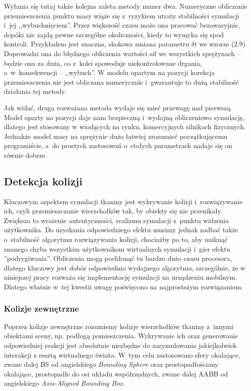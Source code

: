 			Wyłania się tutaj także kolejna zaleta metody numer dwa. Numeryczne obliczanie przemieszczenia punktu masy wiąże się z~ryzykiem utraty stabilności symulacji i~jej ,,wybuchnięciem''. Przez większość czasu może ona pracować bezawaryjnie, dopóki nie zajdą pewne szczególne okoliczności, kiedy to wymyka się spod kontroli. Przykładem jest znaczna, skokowa zmiana parametru \( \delta t \) we wzorze (2.9) Doprowadzi ona do błędnego obliczenia wartości sił we wszystkich sprężynach -- będzie ona za duża, co z~kolei spowoduje niekontrolowane drgania, a~w~konsekwencji -- ,,wybuch''. W modelu opartym na pozycji korekcja przemieszczenia nie jest obliczana numerycznie i~gwarantuje to dużą stabilność działania tej metody.
			
			Jak widać, druga rozważana metoda wydaje się mieć przewagę nad pierwszą. Model oparty na pozycji daje nam bezpieczną i~wydajną obliczeniowo symulację, dlatego jest stosowany w wiodących na rynku, komercyjnych silnikach fizycznych. Jednakże model masy na sprężynie dużo łatwiej zrozumieć początkującemu programiście, a~do prostych zastosowań o~stałych parametrach nadaje się on równie dobrze.
		
		\subsection{Detekcja kolizji}
		\label{t:teoria:analiza:kolizje}
		
			Kluczowym aspektem symulacji tkaniny jest wykrywanie kolizji i~rozwiązywanie ich, czyli przemieszczanie wierzchołków tak, by obiekty się nie przenikały. Zwiększa to wrażenie autentyczności, realizmu symulacji z~punktu widzenia użytkownika. Do uzyskania odpowiedniego efektu musimy jednak zadbać także o~stabilność algorytmu rozwiązywania kolizji, chociażby po to, aby uniknąć znanego chyba wszystkim użytkownikom wirtualnych symulacji i~gier efektu ''podrygiwania''. Obliczenia mogą pochłonąć tu bardzo dużo czasu procesora, dlatego kluczowy jest dobór odpowiednio wydajnego algorytmu, szczególnie, że w niniejszej pracy rozważa się implementację symulacji na urządzeniu mobilnym. Dlatego właśnie w~tej kwestii uwagę poświęcono na najprostszym rozwiązaniom.
		
			\subsubsection{Kolizje zewnętrzne}
			\label{t:teoria:analiza:kolizje:zewn}
			
				Poprzez kolizje zewnętrzne rozumiemy kolizje wierzchołków tkaniny z~innymi obiektami sceny, np. podłogą pomieszczenia. Wykrywanie ich oraz generowanie odpowiedniej reakcji jest absolutnie niezbędne do zasymulowania jakiejkolwiek interakcji z resztą wirtualnego świata. W~tym celu zastosowano sfery okalające, zwane dalej BS od angielskiego \emph{Bounding Sphere} oraz prostopadłościany okalające, prostopadłe do osi układu współrzędnych, zwane dalej AABB od angielskiego \emph{Axis-Aligned Bounding Box}.\newpage
				
